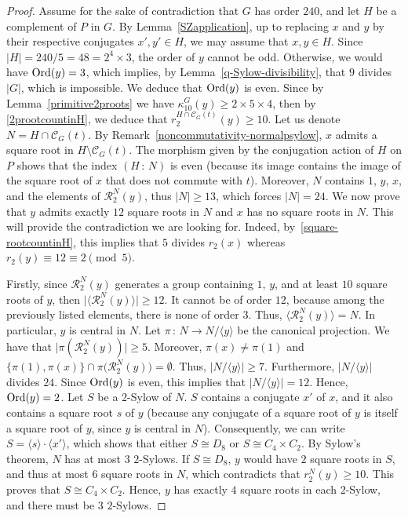 \documentclass[12pt]{amsart}
\numberwithin{equation}{section}
\newcommand{\Ord}{{\rm Ord}}
\theoremstyle{definition}
\theoremstyle{remark}
\begin{document}
\begin{proof}
    Assume for the sake of contradiction that $G$ has order $240$, and let $H$ be a complement of $P$ in $G$. By Lemma~\ref{SZapplication}, up to replacing $x$ and $y$ by their respective conjugates $x',y'\in H$, we may assume that $x,y\in H$. Since $|H|=240/5= 48=2^4\times 3$, the order of $y$ cannot be odd. Otherwise, we would have $\Ord(y)=3$, which implies, by Lemma~\ref{q-Sylow-divisibility}, that $9$ divides $|G|$, which is impossible. We deduce that $\Ord(y)$ is even. Since by Lemma~\ref{primitive2proots} we have $\kappa_{10}^G(y)\ge 2\times 5\times 4$, then by \eqref{2prootcountinH}, we deduce that $r_2^{H\cap \mathcal{C}_G(t)}(y)\ge 10$. Let us denote $N=H\cap \mathcal{C}_G(t)$. By Remark~\ref{noncommutativity-normalpsylow}, $x$ admits a square root in $H\setminus \mathcal{C}_G(t)$. The morphism given by the conjugation action of $H$ on $P$ shows that the index $(H\, \colon\,  N)$ is even (because its image contains the image of the square root of $x$ that does not commute with $t$). Moreover, $N$ contains $1$, $y$, $x$, and the elements of $\mathcal{R}_2^N(y)$, thus $|N|\ge 13$, which forces $|N|=24$. We now prove that $y$ admits exactly $12$ square roots in $N$ and $x$ has no square roots in $N$. This will provide the contradiction we are looking for. Indeed, by~\eqref{square-rootcountinH}, this implies that $5$ divides $r_2(x)$ whereas $r_2(y)\equiv 12\equiv2\pmod{5}$. 
    
    Firstly, since $\mathcal{R}_2^N(y)$ generates a group containing $1$, $y$, and at least $10$ square roots of $y$, then $\bigl|\bigl\langle\mathcal{R}_2^N(y)\bigr\rangle \bigr|\ge 12$. It cannot be of order $12$, because among the previously listed elements, there is none of order $3$. Thus, $\bigl\langle\mathcal{R}_2^N(y)\bigr\rangle=N$. In particular, $y$ is central in $N$. Let $\pi\, \colon\,  N\to N/\langle y\rangle$ be the canonical projection. We have that $\bigl|\pi(\mathcal{R}_2^N(y))\bigr|\ge 5$. Moreover, $\pi(x)\ne \pi(1)$ and $\{ \pi(1),\pi(x)\}\cap \pi\bigl(\mathcal{R}_2^N(y)\bigr)=\emptyset$. Thus, $|N/\langle y\rangle|\ge 7$. Furthermore, $|N/\langle y\rangle|$ divides $24$. Since $\Ord(y)$ is even, this implies that $|N/\langle y\rangle|=12$. Hence, $\Ord(y)=2$. Let $S$ be a $2$-Sylow of $N$. $S$ contains a conjugate $x'$ of $x$, and it also contains a square root $s$ of $y$ (because any conjugate of a square root of $y$ is itself a square root of $y$, since $y$ is central in $N$). Consequently, we can write $S=\langle s\rangle \cdot\langle x'\rangle$, which shows that either $S\cong D_8$ or $S\cong C_4\times C_2$. By Sylow's theorem, $N$ has at most $3$ $2$-Sylows. If $S\cong D_8$, $y$ would have $2$ square roots in $S$, and thus at most $6$ square roots in $N$, which contradicts that $r_2^N(y)\ge 10$. This proves that $S\cong C_4\times C_2$. Hence, $y$ has exactly $4$ square roots in each $2$-Sylow, and there must be $3$ $2$-Sylows.
    

\end{proof}
\end{document}
